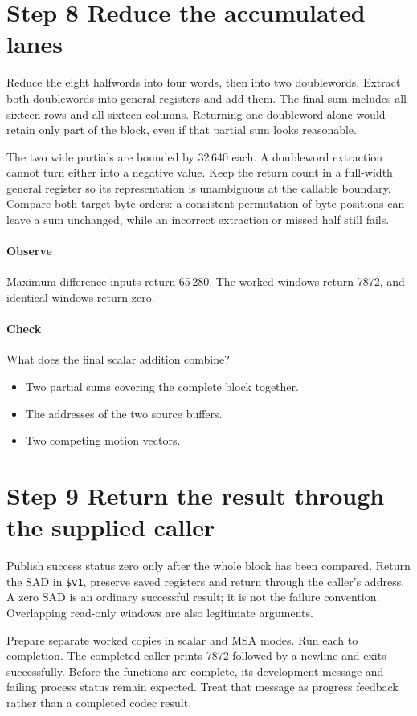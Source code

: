 \section{Step 8 Reduce the accumulated lanes}\label{h263-sad-s08}
Reduce the eight halfwords into four words, then into two doublewords. Extract
both doublewords into general registers and add them. The final sum includes all
sixteen rows and all sixteen columns. Returning one doubleword alone would retain
only part of the block, even if that partial sum looks reasonable.

The two wide partials are bounded by 32\,640 each. A doubleword extraction cannot
turn either into a negative value. Keep the return count in a full-width general
register so its representation is unambiguous at the callable boundary. Compare
both target byte orders: a consistent permutation of byte positions can leave a
sum unchanged, while an incorrect extraction or missed half still fails.

\paragraph{Observe} Maximum-difference inputs return 65\,280. The worked windows
return 7872, and identical windows return zero.
\paragraph{Check} What does the final scalar addition combine?
\begin{itemize}
  \item[A.] Two partial sums covering the complete block together.
  \item[B.] The addresses of the two source buffers.
  \item[C.] Two competing motion vectors.
\end{itemize}

\section{Step 9 Return the result through the supplied caller}\label{h263-sad-s09}
Publish success status zero only after the whole block has been compared. Return
the SAD in \texttt{\$v1}, preserve saved registers and return through the caller's
address. A zero SAD is an ordinary successful result; it is not the failure
convention. Overlapping read-only windows are also legitimate arguments.

Prepare separate worked copies in scalar and MSA modes. Run each to completion.
The completed caller prints 7872 followed by a newline and exits successfully.
Before the functions are complete, its development message and failing process
status remain expected. Treat that message as progress feedback rather than a
completed codec result.

